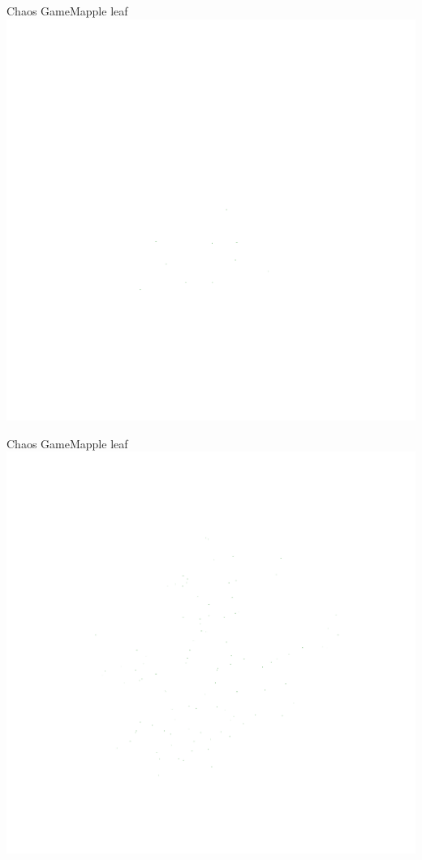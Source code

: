 \documentclass[usenames,dvipsnames,svgnames,10pt,aspectratio=169]{beamer}
\begin{document}
\begin{frame}[t, c]{Chaos Game}{Mapple leaf}
	\centering
	\includegraphics[height=.8\textheight]{Mapple_leaf_0}
	\vspace{1cm}
\end{frame}

\begin{frame}[t, c]{Chaos Game}{Mapple leaf}
	\centering
	\includegraphics[height=.8\textheight]{Mapple_leaf_1}
	\vspace{1cm}
\end{frame}
\end{document}
